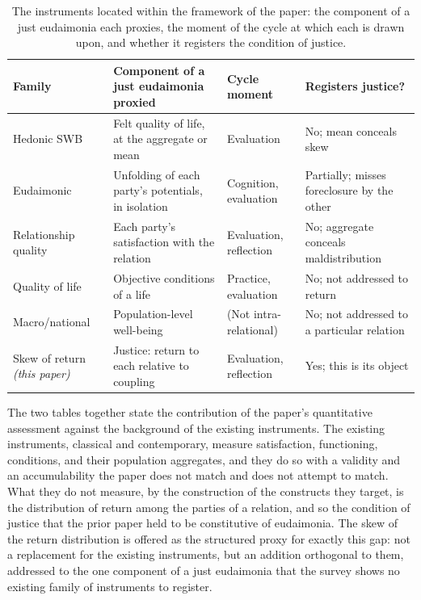 \begin{table}[t]
\centering
\small
\renewcommand{\arraystretch}{1.25}
\caption{The instruments located within the framework of the paper: the component of a just eudaimonia each proxies, the moment of the cycle at which each is drawn upon, and whether it registers the condition of justice.}
\label{p11:tab:framework}
\begin{tabularx}{\linewidth}{@{}>{\raggedright\arraybackslash}p{2.7cm} >{\raggedright\arraybackslash}X >{\raggedright\arraybackslash}p{2.3cm} >{\raggedright\arraybackslash}p{2.3cm}@{}}
\toprule
\rowcolor{pageblush}
\textbf{\textcolor{rosedeep}{Family}} & \textbf{\textcolor{rosedeep}{Component of a just eudaimonia proxied}} & \textbf{\textcolor{rosedeep}{Cycle moment}} & \textbf{\textcolor{rosedeep}{Registers justice?}} \\
\midrule
Hedonic SWB & Felt quality of life, at the aggregate or mean & Evaluation & No; mean conceals skew \\
Eudaimonic & Unfolding of each party's potentials, in isolation & Cognition, evaluation & Partially; misses foreclosure by the other \\
Relationship quality & Each party's satisfaction with the relation & Evaluation, reflection & No; aggregate conceals maldistribution \\
Quality of life & Objective conditions of a life & Practice, evaluation & No; not addressed to return \\
Macro/national & Population-level well-being & (Not intra-relational) & No; not addressed to a particular relation \\
\rowcolor{pageblush}
Skew of return \emph{(this paper)} & Justice: return to each relative to coupling & Evaluation, reflection & Yes; this is its object \\
\bottomrule
\end{tabularx}
\end{table}

The two tables together state the contribution of the paper's quantitative assessment against the background of the existing instruments. The existing instruments, classical and contemporary, measure satisfaction, functioning, conditions, and their population aggregates, and they do so with a validity and an accumulability the paper does not match and does not attempt to match. What they do not measure, by the construction of the constructs they target, is the distribution of return among the parties of a relation, and so the condition of justice that the prior paper held to be constitutive of eudaimonia. The skew of the return distribution is offered as the structured proxy for exactly this gap: not a replacement for the existing instruments, but an addition orthogonal to them, addressed to the one component of a just eudaimonia that the survey shows no existing family of instruments to register.

